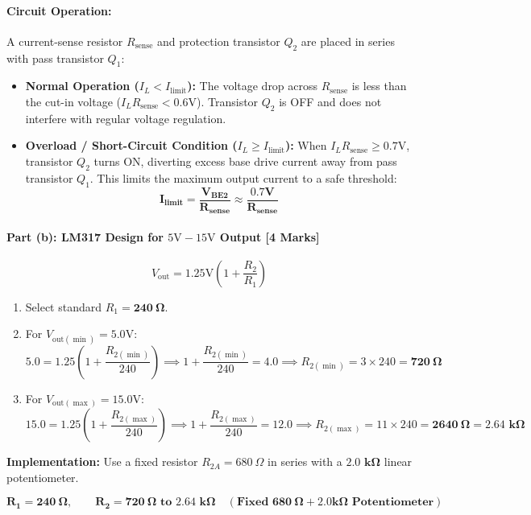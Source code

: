 \documentclass[11pt,a4paper,oneside]{book}
\begin{document}
\paragraph{Circuit Operation:}
A current-sense resistor $R_{\text{sense}}$ and protection transistor $Q_2$ are placed in series with pass transistor $Q_1$:
\begin{itemize}[leftmargin=1.5em]
  \item \textbf{Normal Operation ($I_L < I_{\text{limit}}$):} The voltage drop across $R_{\text{sense}}$ is less than the cut-in voltage ($I_L R_{\text{sense}} < 0.6\text{V}$). Transistor $Q_2$ is OFF and does not interfere with regular voltage regulation.
  \item \textbf{Overload / Short-Circuit Condition ($I_L \ge I_{\text{limit}}$):}
  When $I_L R_{\text{sense}} \ge 0.7\text{V}$, transistor $Q_2$ turns ON, diverting excess base drive current away from pass transistor $Q_1$. This limits the maximum output current to a safe threshold:
  \[
  \mathbf{I_{\text{limit}} = \frac{V_{BE2}}{R_{\text{sense}}} \approx \frac{0.7\text{V}}{R_{\text{sense}}}}
  \]
\end{itemize}

\paragraph{Part (b): LM317 Design for $5\text{V} - 15\text{V}$ Output [4 Marks]}
\[
V_{\text{out}} = 1.25\text{V} \left(1 + \frac{R_2}{R_1}\right)
\]
\begin{enumerate}[leftmargin=1.5em]
  \item Select standard $R_1 = \mathbf{240\ \Omega}$.
  \item For $V_{\text{out}(\min)} = 5.0\text{V}$:
  \[
  5.0 = 1.25 \left(1 + \frac{R_{2(\min)}}{240}\right) \implies 1 + \frac{R_{2(\min)}}{240} = 4.0 \implies R_{2(\min)} = 3 \times 240 = \mathbf{720\ \Omega}
  \]
  \item For $V_{\text{out}(\max)} = 15.0\text{V}$:
  \[
  15.0 = 1.25 \left(1 + \frac{R_{2(\max)}}{240}\right) \implies 1 + \frac{R_{2(\max)}}{240} = 12.0 \implies R_{2(\max)} = 11 \times 240 = \mathbf{2640\ \Omega} = \mathbf{2.64\text{ k}\Omega}
  \]
\end{enumerate}
\textbf{Implementation:} Use a fixed resistor $R_{2A} = 680\ \Omega$ in series with a $\mathbf{2.0\text{ k}\Omega}$ linear potentiometer.

\begin{answerbox}
$$\mathbf{R_1 = 240\ \Omega, \qquad R_2 = 720\ \Omega \text{ to } 2.64\text{ k}\Omega \quad (\text{Fixed } 680\ \Omega + 2.0\text{k}\Omega \text{ Potentiometer})}$$
\end{answerbox}
\end{document}
